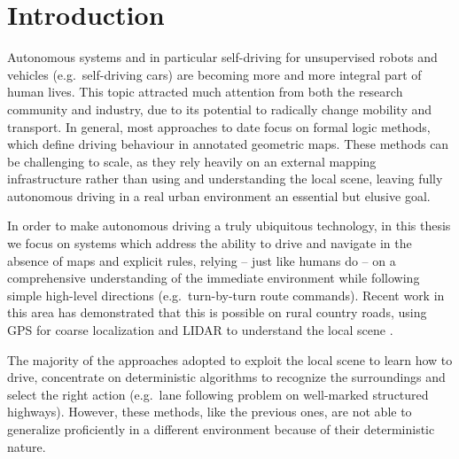 \chapter{Introduction}

Autonomous systems and in particular self-driving for unsupervised robots and vehicles (e.g.\ self-driving cars) are becoming more and more integral part of human lives. This topic attracted much attention from both the research community and industry, due to its potential to radically change mobility and transport. In general, most approaches to date focus on formal logic methods, which define driving behaviour in annotated geometric maps. These methods can be challenging to scale, as they rely heavily on an external mapping infrastructure rather than using and understanding the local scene, leaving fully autonomous driving in a real urban environment an essential but elusive goal.

In order to make autonomous driving a truly ubiquitous technology, in this thesis we focus on systems which address the ability to drive and navigate in the absence of maps and explicit rules, relying – just like humans do – on a comprehensive understanding of the immediate environment while following simple high-level directions (e.g.\ turn-by-turn route commands). Recent work in this area has demonstrated that this is possible on rural country roads, using GPS for coarse localization and LIDAR to understand the local scene \cite{ort2018autonomous}.

The majority of the approaches adopted to exploit the local scene to learn how to drive, concentrate on deterministic algorithms to recognize the surroundings and select the right action (e.g.\ lane following problem on well-marked structured highways). However, these methods, like the previous ones, are not able to generalize proficiently in a different environment because of their deterministic nature.

